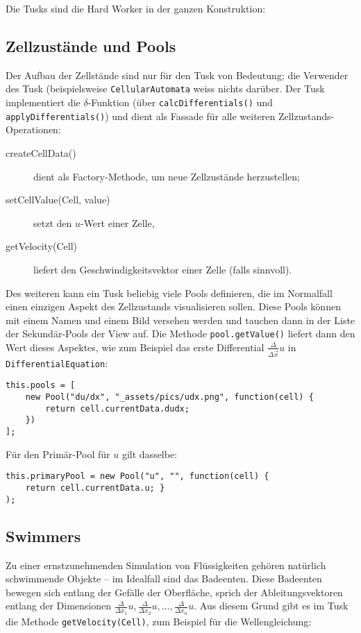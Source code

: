 \documentclass[11pt]{scrreprt} %
\theoremstyle{definition}
\begin{document}
Die Tusks sind die Hard Worker in der ganzen Konstruktion:


\subsection{Zellzustände und Pools}

Der Aufbau der Zellstände sind nur für den Tusk von Bedeutung; die Verwender des Tusk (beispielsweise {\tt CellularAutomata} weiss nichts darüber. Der Tusk implementiert die $\delta$-Funktion (über {\tt calcDifferentials()} und {\tt applyDifferentials()}) und dient als Fassade für alle weiteren Zellzustands-Operationen:

\begin{description}
\item[createCellData()] dient als Factory-Methode, um neue Zellzustände herzustellen;
\item[setCellValue(Cell, value)] setzt den $u$-Wert einer Zelle,
\item[getVelocity(Cell)] liefert den Geschwindigkeitsvektor einer Zelle (falls sinnvoll).
\end{description}

Des weiteren kann ein Tusk beliebig viele Pools definieren, die im Normalfall einen einzigen Aspekt des Zellzustands visualisieren sollen. Diese Pools können mit einem Namen und einem Bild versehen werden und tauchen dann in der Liste der Sekundär-Pools der View auf. Die Methode {\tt pool.getValue()} liefert dann den Wert dieses Aspektes, wie zum Beispiel das erste Differential $\frac{\Delta}{\Delta \vec x} u$ in {\tt DifferentialEquation}:

\begin{lstlisting}
this.pools = [
	new Pool("du/dx", "_assets/pics/udx.png", function(cell) {
		return cell.currentData.dudx;
	})
];
\end{lstlisting}

Für den Primär-Pool für $u$ gilt dasselbe:
\begin{lstlisting}
this.primaryPool = new Pool("u", "", function(cell) {
	return cell.currentData.u; }
);
\end{lstlisting}

\subsection{Swimmers}

Zu einer ernstzunehmenden Simulation von Flüssigkeiten gehören natürlich schwimmende Objekte -- im Idealfall sind das Badeenten. Diese Badeenten bewegen sich entlang der Gefälle der Oberfläche, sprich der Ableitungsvektoren entlang der Dimensionen $\frac {\Delta}{\Delta x_1}u, \frac {\Delta}{\Delta x_2}u, \dots, \frac {\Delta}{\Delta x_n}u$. Aus diesem Grund gibt es im Tusk die Methode {\tt getVelocity(Cell)}, zum Beispiel für die Wellengleichung:
\end{document}
